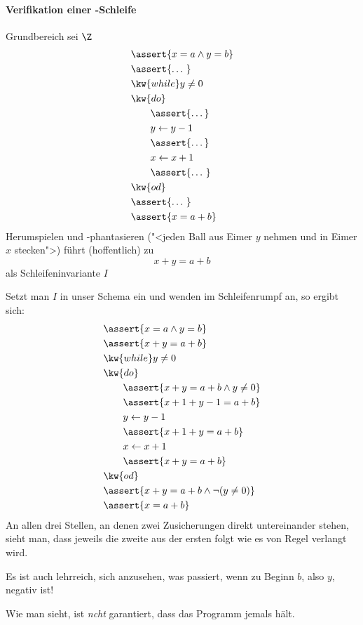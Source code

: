 \begin{tutorium}
  \paragraph{Verifikation einer -Schleife}

  Grundbereich sei $\Z$
  \begin{align*}
    &\assert{x=a \land y=b}  \\
    &\assert{ \dots\ } \\
    &\kw{while } y\not=0  \\
    &\kw{do } \\
    &\qquad\assert{ \dots } \\
    &\qquad y \gets y-1 \\
    &\qquad\assert{ \dots } \\
    &\qquad x \gets x+1 \\
    &\qquad\assert{ \dots\ } \\
    &\kw{od } \\
    &\assert{ \dots\ } \\
    &\assert{x=a+b} \\
  \end{align*}
  Herumspielen und -phantasieren ("<jeden Ball aus Eimer $y$ nehmen und
  in Eimer $x$ stecken">) führt (hoffentlich) zu
  \[
  x+y = a+b 
  \]
  als Schleifeninvariante $I$

  Setzt man $I$ in unser Schema ein und wenden im Schleifenrumpf 
  an, so ergibt sich:
  \begin{align*}
    &\assert{x=a \land y=b }  \\
    &\assert{x+y=a+b }  \\
    &\kw{while } y\not=0  \\
    &\kw{do } \\
    &\qquad\assert{x+y=a+b \land y\not=0 }  \\
    &\qquad\assert{x+1+y-1=a+b } \\
    &\qquad y \gets y-1 \\
    &\qquad\assert{x+1+y = a+b} \\
    &\qquad x \gets x+1 \\
    &\qquad\assert{x+y = a+b} \\
    &\kw{od } \\
    &\assert{x+y = a+b \land \lnot(y\not=0) } \\
    &\assert{x=a+b} \\
  \end{align*}
  An allen drei Stellen, an denen zwei Zusicherungen direkt
  untereinander stehen, sieht man, dass jeweils die zweite aus der
  ersten folgt wie es von Regel  verlangt wird.

  Es ist auch lehrreich, sich anzusehen, was passiert, wenn zu Beginn
  $b$, also $y$, negativ ist!

  Wie man sieht, ist \emph{ncht} garantiert, dass das Programm jemals
  hält.
\end{tutorium}
%

